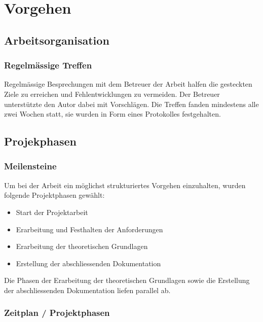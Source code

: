 
\chapter{Vorgehen}
\label{chap:procedure}

\section{Arbeitsorganisation}
\label{sec:organization}

\subsection{Regelmässige Treffen}
\label{subsec:meetings}

Regelmässige Besprechungen mit dem Betreuer der Arbeit halfen die
gesteckten Ziele zu erreichen und Fehlentwicklungen zu vermeiden. Der
Betreuer unterstützte den Autor dabei mit Vorschlägen. Die Treffen
fanden mindestens alle zwei Wochen statt, sie wurden in Form eines
Protokolles festgehalten.

\section{Projekphasen}
\label{sec:project_schedule}

\subsection{Meilensteine}
\label{subsec:milestones}

Um bei der Arbeit ein möglichst strukturiertes Vorgehen einzuhalten, wurden folgende Projektphasen gewählt:
\begin{itemize}
    \item Start der Projektarbeit
    \item Erarbeitung und Festhalten der Anforderungen
    \item Erarbeitung der theoretischen Grundlagen
    \item Erstellung der abschliessenden Dokumentation
\end{itemize}

Die Phasen der Erarbeitung der theoretischen Grundlagen sowie die Erstellung der abschliessenden Dokumentation liefen parallel ab.

\subsection{Zeitplan / Projektphasen}
\label{subsec:timeschedule}

